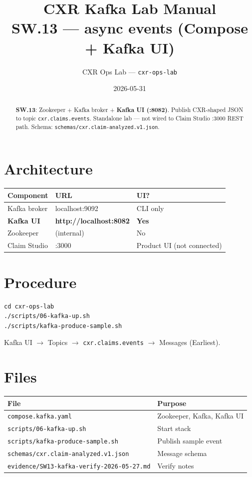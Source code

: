 \documentclass[11pt,a4paper]{report}
\title{CXR Kafka Lab Manual\\
\large SW.13 --- async events (Compose + Kafka UI)}
\author{CXR Ops Lab --- \texttt{cxr-ops-lab}}
\date{2026-05-31}
\begin{document}
\maketitle
\begin{abstract}
\textbf{SW.13}: Zookeeper + Kafka broker + \textbf{Kafka UI (:8082)}. Publish CXR-shaped JSON to topic
\texttt{cxr.claims.events}. Standalone lab --- not wired to Claim Studio :3000 REST path.
Schema: \texttt{schemas/cxr.claim-analyzed.v1.json}.
\end{abstract}
\tableofcontents
\newpage

\chapter{Architecture}

\begin{center}
\begin{tabular}{lll}
\toprule
Component & URL & UI? \\
\midrule
Kafka broker & localhost:9092 & CLI only \\
\textbf{Kafka UI} & \textbf{http://localhost:8082} & \textbf{Yes} \\
Zookeeper & (internal) & No \\
Claim Studio & :3000 & Product UI (not connected) \\
\bottomrule
\end{tabular}
\end{center}

\chapter{Procedure}

\begin{lstlisting}[style=bash]
cd cxr-ops-lab
./scripts/06-kafka-up.sh
./scripts/kafka-produce-sample.sh
\end{lstlisting}

Kafka UI $\rightarrow$ Topics $\rightarrow$ \texttt{cxr.claims.events} $\rightarrow$ Messages (Earliest).

\chapter{Files}

\begin{longtable}{@{}p{5cm}p{8cm}@{}}
\toprule
File & Purpose \\
\midrule
\endhead
\texttt{compose.kafka.yaml} & Zookeeper, Kafka, Kafka UI \\
\texttt{scripts/06-kafka-up.sh} & Start stack \\
\texttt{scripts/kafka-produce-sample.sh} & Publish sample event \\
\texttt{schemas/cxr.claim-analyzed.v1.json} & Message schema \\
\texttt{evidence/SW13-kafka-verify-2026-05-27.md} & Verify notes \\
\bottomrule
\end{longtable}
\end{document}
